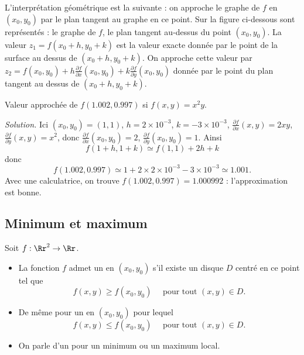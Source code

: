 \documentclass[11pt,class=report,crop=false]{standalone}
\begin{document}
L'interprétation géométrique est la suivante : 
on approche le graphe de $f$ en $(x_0,y_0)$ par le plan tangent au graphe en ce point. Sur la figure ci-dessous sont représentés : le graphe de $f$, le plan tangent au-dessus du point $(x_0,y_0)$. La valeur $z_1 = f(x_0+h,y_0+k)$ est la valeur exacte donnée par le point de la surface au dessus de $(x_0+h,y_0+k)$. On approche cette valeur par $z_2 = f(x_0,y_0) + h\frac{\partial f}{\partial x}(x_0,y_0)
+k\frac{\partial f}{\partial y}(x_0,y_0)$ donnée par le point du plan tangent au dessus de $(x_0+h,y_0+k)$. 




\begin{exemple}
Valeur approchée de $f(1.002, 0.997)$ si $f(x,y) = x^2y$.
\bigskip

\emph{Solution.}
Ici $(x_0,y_0) = (1,1)$, $h = 2 \times 10^{-3}$, $k = -3 \times 10^{-3}$,
$\frac{\partial f}{\partial x}(x,y) = 2xy$, $\frac{\partial f}{\partial y}(x,y) = x^2$, donc $\frac{\partial f}{\partial x}(x_0,y_0) = 2$, $\frac{\partial f}{\partial y}(x_0,y_0) = 1$. Ainsi
$$f(1+h,1+k) \simeq f(1,1) + 2h + k$$
donc 
$$f(1.002, 0.997) \simeq 1 + 2 \times 2 \times 10^{-3} - 3 \times 10^{-3} \simeq 1.001.$$
Avec une calculatrice, on trouve $f(1.002, 0.997) = 1.000992$ : l'approximation est bonne.
\end{exemple}


\subsection{Minimum et maximum}

\begin{definition}
Soit $f : \Rr^2 \to \Rr$.
\begin{itemize}
  \item La fonction $f$ admet un  en $(x_0,y_0)$ s'il existe un disque $D$ centré en ce point tel que 
$$ f(x,y) \ge f(x_0,y_0) \quad \text{ pour tout } (x,y) \in D.$$
  \item De même pour un  en $(x_0,y_0)$  pour lequel 
$$f(x,y) \le f(x_0,y_0) \quad \text{ pour tout } (x,y) \in D.$$
  \item On parle d'un  pour un minimum ou un maximum local.
\end{itemize}
\end{definition}
\end{document}
